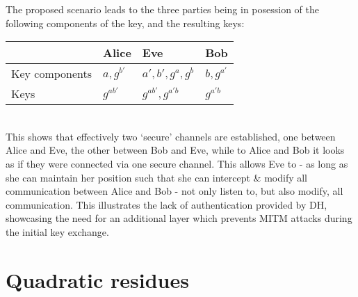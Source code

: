\documentclass[a4paper]{scrreprt}
\begin{document}
The proposed scenario leads to the three parties being in posession of the
following components of the key, and the resulting keys:
\\

\begin{tabular}{llll}
	\toprule
	& Alice & Eve & Bob \\
	\midrule
	Key components & $a, g^{b'}$ & $a', b', g^a, g^b$ & $b, g^{a'}$ \\
	Keys & $g^{ab'}$ & $g^{ab'}, g^{a'b}$ & $g^{a'b}$ \\
	\bottomrule
\end{tabular}
\\

This shows that effectively two `secure' channels are established, one between
Alice and Eve, the other between Bob and Eve, while to Alice and Bob it looks
as if they were connected via one secure channel. This allows Eve to - as long
as she can maintain her position such that she can intercept \& modify all
communication between Alice and Bob - not only listen to, but also modify, all
communication. This illustrates the lack of authentication provided by DH,
showcasing the need for an additional layer which prevents MITM attacks during
the initial key exchange.

\section{Quadratic residues}
\end{document}
